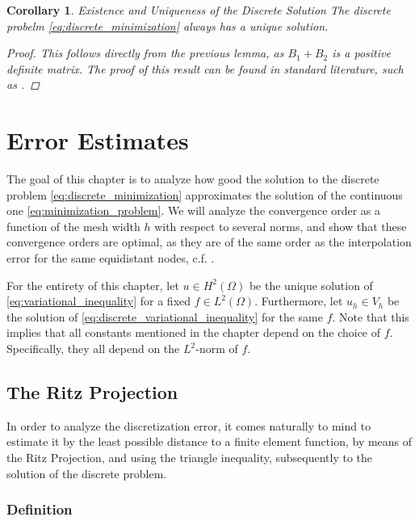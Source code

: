 \documentclass[headsepline,footsepline,footinclude=false,oneside,fontsize=11pt,paper=a4,listof=totoc,bibliography=totoc]{scrbook} %
\newtheorem{corollary}{Corollary}
\begin{document}
\begin{corollary} Existence and Uniqueness of the Discrete Solution \newline
	The discrete probelm \eqref{eq:discrete_minimization} always has a unique solution.
	\begin{proof}
		This follows directly from the previous lemma, as $B_1 + B_2$ is a positive definite matrix. The proof of this result can be found in standard literature, such as \cite{ulbrich2012nichtlineare}.
	\end{proof}
\end{corollary}

\chapter{Error Estimates}
The goal of this chapter is to analyze how good the solution to the discrete problem \eqref{eq:discrete_minimization} approximates the solution of the continuous one \eqref{eq:minimization_problem}. We will analyze the convergence order as a function of the mesh width $h$ with respect to several norms, and show that these convergence orders are optimal, as they are of the same order as the interpolation error for the same equidistant nodes, c.f. \cite{brenner2002mathematical}. 

For the entirety of this chapter, let $u \in H^2(\Omega)$ be the unique solution of \eqref{eq:variational_inequality} for a fixed $f \in L^2(\Omega)$. Furthermore, let $u_h \in V_h$ be the solution of \eqref{eq:discrete_variational_inequality} for the same $f$. Note that this implies that all constants mentioned in the chapter depend on the choice of $f$. Specifically, they all depend on the $L^2$-norm of $f$.

\section{The Ritz Projection}
In order to analyze the discretization error, it comes naturally to mind to estimate it by the least possible distance to a finite element function, by means of the Ritz Projection, and using the triangle inequality, subsequently to the solution of the discrete problem.

\subsection{Definition}
\end{document}
